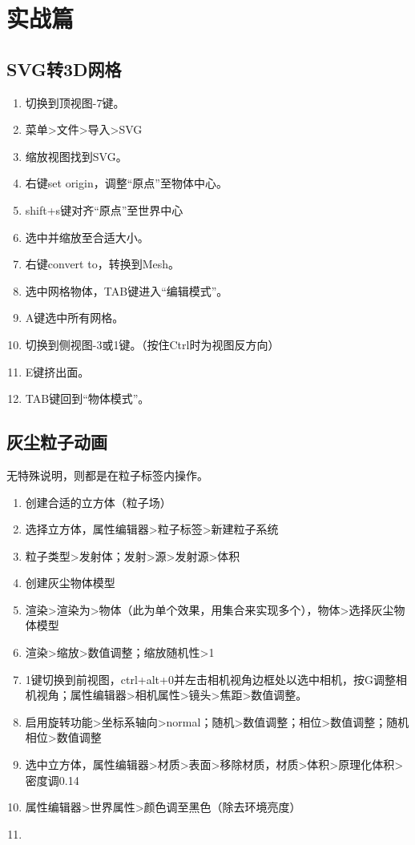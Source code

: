 \section{实战篇}

\subsection{SVG转3D网格}
\begin{enumerate}
    \item 切换到顶视图-7键。
    \item 菜单>文件>导入>SVG
    \item 缩放视图找到SVG。
    \item 右键set origin，调整“原点”至物体中心。
    \item shift+s键对齐“原点”至世界中心
    \item 选中并缩放至合适大小。
    \item 右键convert to，转换到Mesh。
    \item 选中网格物体，TAB键进入“编辑模式”。
    \item A键选中所有网格。
    \item 切换到侧视图-3或1键。（按住Ctrl时为视图反方向）
    \item E键挤出面。
    \item TAB键回到“物体模式”。
\end{enumerate}

\subsection{灰尘粒子动画}
无特殊说明，则都是在粒子标签内操作。
\begin{enumerate}
    \item 创建合适的立方体（粒子场）
    \item 选择立方体，属性编辑器>粒子标签>新建粒子系统
    \item 粒子类型>发射体；发射>源>发射源>体积
    \item 创建灰尘物体模型
    \item 渲染>渲染为>物体（此为单个效果，用集合来实现多个），物体>选择灰尘物体模型
    \item 渲染>缩放>数值调整；缩放随机性>1
    \item 1键切换到前视图，ctrl+alt+0并左击相机视角边框处以选中相机，按G调整相机视角；属性编辑器>相机属性>镜头>焦距>数值调整。
    \item 启用旋转功能>坐标系轴向>normal；随机>数值调整；相位>数值调整；随机相位>数值调整
    \item 选中立方体，属性编辑器>材质>表面>移除材质，材质>体积>原理化体积>密度调0.14
    \item 属性编辑器>世界属性>颜色调至黑色（除去环境亮度）
    \item
\end{enumerate}
